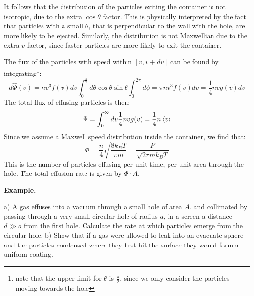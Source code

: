 \documentclass[a4paper,11pt,oneside]{book}
\begin{document}
It follows that the distribution of the particles exiting the container is not isotropic, due to the extra $\cos \theta$ factor. This is physically interpreted by the fact that particles with a small $\theta$, that is perpendicular to the wall with the hole, are more likely to be ejected. Similarly, the distribution is not Maxwellian due to the extra $v$ factor, since faster particles are more likely to exit the container. 


The flux of the particles with speed within $[v, v+dv]$ can be found by integrating\footnote{note that the upper limit for $\theta$ is $\frac{\pi}{2}$, since we only consider the particles moving towards the hole}:
\begin{equation}
    d\hat{\Phi}(v)=nv^3 f(v)dv \int_0^\frac{\pi}{2} d\theta \cos \theta \sin \theta \int_0^{2\pi} d\phi=\pi nv^3f(v)dv = \frac{1}{4}nvg(v)dv
\end{equation}
The total flux of effusing particles is then:
\begin{equation}
    \Phi = \int_0^\infty dv \frac{1}{4}nvg(v) = \frac{1}{4}n\braket{v}
\end{equation}
Since we assume a Maxwell speed distribution inside the container, we find that:
\begin{equation}
    \boxed{\Phi = \frac{n}{4}\sqrt{\frac{8k_BT}{\pi m}} = \frac{P}{\sqrt{2\pi m k_B T}}}
\end{equation}
This is the number of particles effusing per unit time, per unit area through the hole. The total effusion rate is given by $\Phi \cdot A$. 
\begin{strategy}
\sffamily \textbf{Example.} 


a) A gas effuses into a vacuum through a small hole of area $A$. and collimated by passing through a very small circular hole of radius $a$, in a screen a distance $d \gg a$ from the first hole. Calculate the rate at which particles emerge from the circular hole. 
b) Show that if a gas were allowed to leak into an evacuate sphere and the particles condensed where they first hit the surface they would form a uniform coating.
\end{strategy}
\end{document}
